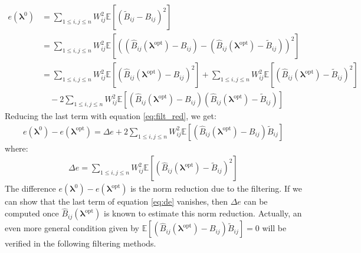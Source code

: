 \documentclass[12pt]{scrartcl}
\begin{document}
\begin{align}
e\left(\boldsymbol{\lambda}^0\right) & = \sum_{1 \le i,j \le n} W_{ij}^2 \mathbb{E}\left[ \left(\widetilde{B}_{ij} - B_{ij} \right)^2 \right] \nonumber \\
& = \sum_{1 \le i,j \le n} W_{ij}^2 \mathbb{E}\left[ \left(\left(\widehat{B}_{ij}\left(\boldsymbol{\lambda}^\mathrm{opt}\right) - B_{ij}\right) - \left(\widehat{B}_{ij}\left(\boldsymbol{\lambda}^\mathrm{opt}\right) - \widetilde{B}_{ij}\right)\right)^2 \right] \nonumber \\
& = \sum_{1 \le i,j \le n} W_{ij}^2 \mathbb{E}\left[ \left(\widehat{B}_{ij}\left(\boldsymbol{\lambda}^\mathrm{opt}\right) - B_{ij}\right)^2\right] + \sum_{1 \le i,j \le n} W_{ij}^2 \mathbb{E}\left[ \left(\widehat{B}_{ij}\left(\boldsymbol{\lambda}^\mathrm{opt}\right) - \widetilde{B}_{ij}\right)^2\right] \nonumber \\
& \quad - 2 \sum_{1 \le i,j \le n} W_{ij}^2 \mathbb{E}\left[\left(\widehat{B}_{ij}\left(\boldsymbol{\lambda}^\mathrm{opt}\right) - B_{ij}\right) \left(\widehat{B}_{ij}\left(\boldsymbol{\lambda}^\mathrm{opt}\right) - \widetilde{B}_{ij}\right) \right]
\end{align}
Reducing the last term with equation \eqref{eq:filt_red}, we get:
\begin{align}
\label{eq:de}
e\left(\boldsymbol{\lambda}^0\right) - e\left(\boldsymbol{\lambda}^\mathrm{opt}\right) = \Delta e + 2 \sum_{1 \le i,j \le n} W_{ij}^2 \mathbb{E}\left[ \left(\widehat{B}_{ij}\left(\boldsymbol{\lambda}^\mathrm{opt}\right) - B_{ij}\right) \widetilde{B}_{ij} \right]
\end{align}
where:
\begin{align}
\Delta e = \sum_{1 \le i,j \le n} W_{ij}^2 \mathbb{E}\left[ \left(\widehat{B}_{ij}\left(\boldsymbol{\lambda}^\mathrm{opt}\right) - \widetilde{B}_{ij}\right)^2\right]
\end{align}
The difference $e\left(\boldsymbol{\lambda}^0\right) - e\left(\boldsymbol{\lambda}^\mathrm{opt}\right)$ is the norm reduction due to the filtering. If we can show that the last term of equation \eqref{eq:de} vanishes, then $\Delta e$ can be computed once $\widehat{B}_{ij}\left(\boldsymbol{\lambda}^\mathrm{opt}\right)$ is known to estimate this norm reduction. Actually, an even more general condition given by $\displaystyle \mathbb{E}\left[\left(\widehat{B}_{ij}\left(\boldsymbol{\lambda}^\mathrm{opt}\right) - B_{ij}\right) \widetilde{B}_{ij}  \right] = 0$ will be verified in the following filtering methods.\\
\end{document}
